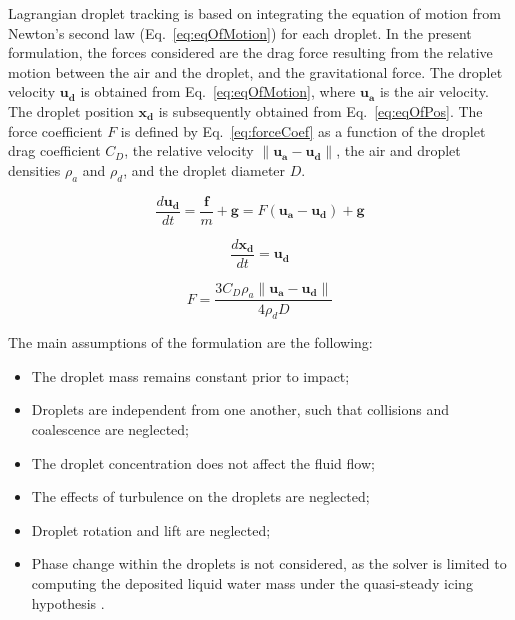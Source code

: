 Lagrangian droplet tracking is based on integrating the equation of motion from Newton's second law (Eq.~\ref{eq:eqOfMotion}) for each droplet. In the present formulation, the forces considered are the drag force resulting from the relative motion between the air and the droplet, and the gravitational force. The droplet velocity $\boldsymbol{u_d}$ is obtained from Eq.~\ref{eq:eqOfMotion}, where $\boldsymbol{u_a}$ is the air velocity. The droplet position $\boldsymbol{x_d}$ is subsequently obtained from Eq.~\ref{eq:eqOfPos}. The force coefficient $F$ is defined by Eq.~\ref{eq:forceCoef} as a function of the droplet drag coefficient $C_D$, the relative velocity $\| \boldsymbol{u_a} - \boldsymbol{u_d}\|$, the air and droplet densities $\rho_a$ and $\rho_d$, and the droplet diameter $D$.

\begin{equation}
\frac{d\boldsymbol{u_d}}{dt} = \frac{\textbf{f}}{m} + \textbf{g} = F( \boldsymbol{u_a}- \boldsymbol{u_d}) + \textbf{g}
\label{eq:eqOfMotion}
\end{equation}

\begin{equation}
\frac{d\boldsymbol{x_d}}{dt} = \boldsymbol{u_d}
\label{eq:eqOfPos}
\end{equation}

\begin{equation}
F  = \frac{3 C_D  \rho_a \| \boldsymbol{u_a} -  \boldsymbol{u_d}\| }{4 \rho_d D}
\label{eq:forceCoef}
\end{equation}

\noindent The main assumptions of the formulation are the following:

\begin{itemize}
        \item The droplet mass remains constant prior to impact;
        \item Droplets are independent from one another, such that collisions and coalescence are neglected;
        \item The droplet concentration does not affect the fluid flow;
        \item The effects of turbulence on the droplets are neglected;
        \item Droplet rotation and lift are neglected;
        \item Phase change within the droplets is not considered, as the solver is limited to computing the deposited liquid water mass under the quasi-steady icing hypothesis \cite{KIND1998257}.
\end{itemize}

